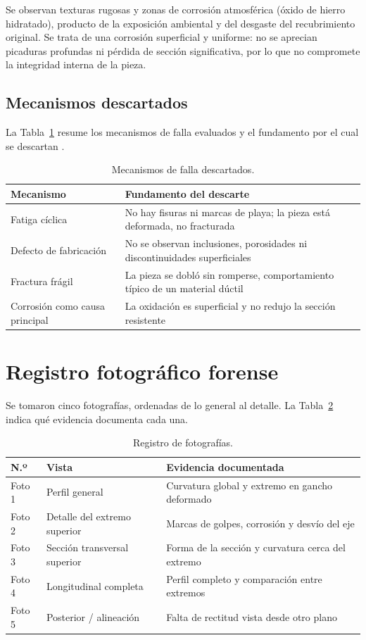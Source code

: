 \documentclass[runningheads]{llncs}
\begin{document}
Se observan texturas rugosas y zonas de corrosión atmosférica (óxido de hierro hidratado), producto de la exposición ambiental y del desgaste del recubrimiento original. Se trata de una corrosión superficial y uniforme: no se aprecian picaduras profundas ni pérdida de sección significativa, por lo que no compromete la integridad interna de la pieza.

\subsection{Mecanismos descartados}

La Tabla~\ref{tab:descartados} resume los mecanismos de falla evaluados y el fundamento por el cual se descartan \cite{asm11}.

\begin{table}
\caption{Mecanismos de falla descartados.}\label{tab:descartados}
\centering
\begin{tabular}{|p{3.4cm}|p{7.3cm}|}
\hline
\textbf{Mecanismo} & \textbf{Fundamento del descarte}\\
\hline
Fatiga cíclica & No hay fisuras ni marcas de playa; la pieza está deformada, no fracturada\\
Defecto de fabricación & No se observan inclusiones, porosidades ni discontinuidades superficiales\\
Fractura frágil & La pieza se dobló sin romperse, comportamiento típico de un material dúctil\\
Corrosión como causa principal & La oxidación es superficial y no redujo la sección resistente\\
\hline
\end{tabular}
\end{table}

\section{Registro fotográfico forense}

Se tomaron cinco fotografías, ordenadas de lo general al detalle. La Tabla~\ref{tab:fotos} indica qué evidencia documenta cada una.

\begin{table}
\caption{Registro de fotografías.}\label{tab:fotos}
\centering
\begin{tabular}{|p{1.4cm}|p{3.6cm}|p{5.7cm}|}
\hline
\textbf{N.º} & \textbf{Vista} & \textbf{Evidencia documentada}\\
\hline
Foto 1 & Perfil general & Curvatura global y extremo en gancho deformado\\
Foto 2 & Detalle del extremo superior & Marcas de golpes, corrosión y desvío del eje\\
Foto 3 & Sección transversal superior & Forma de la sección y curvatura cerca del extremo\\
Foto 4 & Longitudinal completa & Perfil completo y comparación entre extremos\\
Foto 5 & Posterior / alineación & Falta de rectitud vista desde otro plano\\
\hline
\end{tabular}
\end{table}
\end{document}
